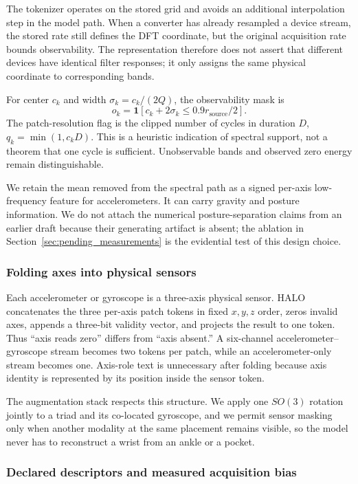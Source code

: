 The tokenizer operates on the stored grid and avoids an additional interpolation step in the model
path. When a converter has already resampled a device stream, the stored rate still defines the DFT
coordinate, but the original acquisition rate bounds observability. The representation therefore
does not assert that different devices have identical filter responses; it only assigns the same
physical coordinate to corresponding bands.

For center $c_k$ and width $\sigma_k=c_k/(2Q)$, the observability mask is
\[
 o_k=\mathbf{1}\!\left[c_k+2\sigma_k\leq0.9r_{\mathrm{source}}/2\right].
\]
The patch-resolution flag is the clipped number of cycles in duration $D$,
$q_k=\min(1,c_kD)$. This is a heuristic indication of spectral support, not a theorem that one cycle
is sufficient. Unobservable bands and observed zero energy remain distinguishable.

We retain the mean removed from the spectral path as a signed per-axis low-frequency feature for
accelerometers. It can carry gravity and posture information. We do not attach the numerical
posture-separation claims from an earlier draft because their generating artifact is absent; the
ablation in Section~\ref{sec:pending_measurements} is the evidential test of this design choice.

\subsubsection{Folding axes into physical sensors}
\label{sec:sensor_grouping}

Each accelerometer or gyroscope is a three-axis physical sensor. HALO concatenates the three
per-axis patch tokens in fixed $x,y,z$ order, zeros invalid axes, appends a three-bit validity
vector, and projects the result to one token. Thus ``axis reads zero'' differs from ``axis absent.''
A six-channel accelerometer--gyroscope stream becomes two tokens per patch, while an
accelerometer-only stream becomes one. Axis-role text is unnecessary after folding because axis
identity is represented by its position inside the sensor token.

The augmentation stack respects this structure. We apply one $SO(3)$ rotation jointly to a triad and
its co-located gyroscope, and we permit sensor masking only when another modality at the same
placement remains visible, so the model never has to reconstruct a wrist from an ankle or a pocket.

\subsubsection{Declared descriptors and measured acquisition bias}
\label{sec:conditioning}

